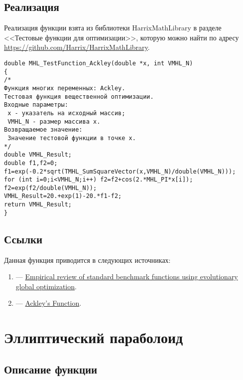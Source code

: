 \subsection {Реализация}

Реализация функции взята из библиотеки HarrixMathLibrary в разделе <<Тестовые функции для оптимизации>>, которую можно найти по адресу \href{https://github.com/Harrix/HarrixMathLibrary} {https://github.com/Harrix/HarrixMathLibrary}.

\begin{lstlisting}[caption=Код функции MHL\_TestFunction\_Ackley]
double MHL_TestFunction_Ackley(double *x, int VMHL_N)
{
/*
Функция многих переменных: Ackley.
Тестовая функция вещественной оптимизации.
Входные параметры:
 x - указатель на исходный массив;
 VMHL_N - размер массива x.
Возвращаемое значение:
 Значение тестовой функции в точке x.
*/
double VMHL_Result;
double f1,f2=0;
f1=exp(-0.2*sqrt(TMHL_SumSquareVector(x,VMHL_N)/double(VMHL_N)));
for (int i=0;i<VMHL_N;i++) f2=f2+cos(2.*MHL_PI*x[i]);
f2=exp(f2/double(VMHL_N));
VMHL_Result=20.+exp(1)-20.*f1-f2;
return VMHL_Result;
}
\end{lstlisting}

\subsection {Ссылки}

Данная функция приводится в следующих источниках:

\begin{enumerate}
\item \cite[стр. 5]{web:1207.4318} ---  \href{http://arxiv.org/pdf/1207.4318v1.pdf}{Empirical review of standard benchmark functions using evolutionary global optimization}.
\item \cite{web:www.cs.unm.edu:AckleysFunction} ---  \href{http://www.cs.unm.edu/~neal.holts/dga/benchmarkFunction/ackley.html}{Ackley's Function}.
\end{enumerate}


\section {Эллиптический параболоид}

\subsection {Описание функции}

